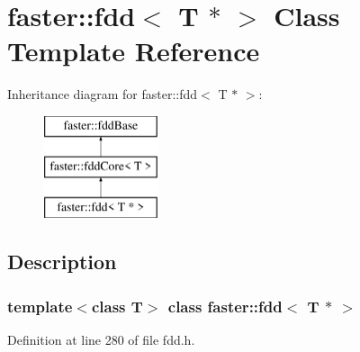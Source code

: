 \hypertarget{classfaster_1_1fdd_3_01T_01_5_01_4}{}\section{faster\+:\+:fdd$<$ T $\ast$ $>$ Class Template Reference}
\label{classfaster_1_1fdd_3_01T_01_5_01_4}
Inheritance diagram for faster\+:\+:fdd$<$ T $\ast$ $>$\+:\begin{figure}[H]
\begin{center}
\leavevmode
\includegraphics[height=3.000000cm]{classfaster_1_1fdd_3_01T_01_5_01_4}
\end{center}
\end{figure}


\subsection{Description}
\subsubsection*{template$<$class T$>$\newline
class faster\+::fdd$<$ T $\ast$ $>$}



Definition at line 280 of file fdd.\+h.

